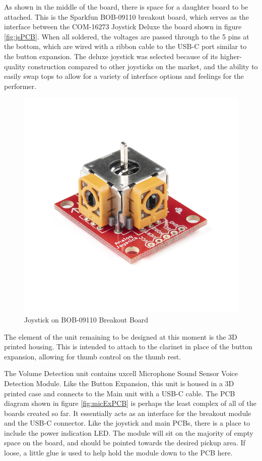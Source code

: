 As shown in the middle of the board, there is space for a daughter board to be attached. This is the Sparkfun BOB-09110 breakout board, which serves as the interface between the COM-16273 Joystick Deluxe the board shown in figure \ref{fig:jsPCB}. When all soldered, the voltages are passed through to the 5 pins at the bottom, which are wired with a ribbon cable to the USB-C port similar to the button expansion. The deluxe joystick was selected because of its higher-quality construction compared to other joysticks on the market, and the ability to easily swap tops to allow for a variety of interface options and feelings for the performer.

\begin{figure}
    \centering
    \includegraphics{diagrams/oem/16273-Thumb_Joystick_-_Deluxe-03.jpg}
    \caption{Joystick on BOB-09110 Breakout Board}
    \label{fig:js2}
\end{figure}

The element of the unit remaining to be designed at this moment is the 3D printed housing. This is intended to attach to the clarinet in place of the button expansion, allowing for thumb control on the thumb rest.


The Volume Detection unit contains uxcell Microphone Sound Sensor Voice Detection Module. Like the Button Expansion, this unit is housed in a 3D printed case and connects to the Main unit with a USB-C cable. The PCB diagram shown in figure \ref{fig:micExPCB} is perhaps the least complex of all of the boards created so far. It essentially acts as an interface for the breakout module and the USB-C connector. Like the joystick and main PCBs, there is a place to include the power indication LED. The module will sit on the majority of empty space on the board, and should be pointed towards the desired pickup area. If loose, a little glue is used to help hold the module down to the PCB here. 

